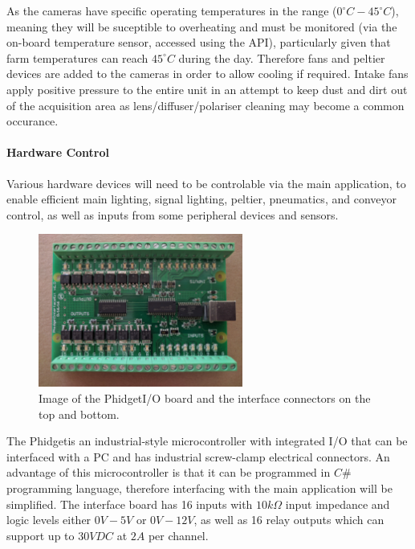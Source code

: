 \documentclass[fleqn,twoside]{article}
\begin{document}
As the cameras have specific operating temperatures in the range ($0^{\circ}C-45^{\circ}C$), meaning they will be suceptible to overheating and must be monitored (via the on-board temperature sensor, accessed using the API), particularly given that farm temperatures can reach $45^{\circ}C$ during the day. Therefore fans and peltier devices are added to the cameras in order to allow cooling if required. Intake fans apply positive pressure to the entire unit in an attempt to keep dust and dirt out of the acquisition area as lens/diffuser/polariser cleaning may become a common occurance.


\paragraph{Hardware Control}
\label{sec:phidget}

Various hardware devices will need to be controlable via the main application, to enable efficient main lighting, signal lighting, peltier, pneumatics, and conveyor control, as well as inputs from some peripheral devices and sensors.



\begin{figure}
	\begin{center}
		\includegraphics[width=0.6\textwidth]{phidget.jpg}
	\end{center}
	\caption{Image of the Phidget\texttrademark I/O board and the interface connectors on the top and bottom.}
	\label{fig:phidget}
\end{figure} 

The Phidget\texttrademark is an industrial-style microcontroller with integrated I/O that can be interfaced with a PC and has industrial screw-clamp electrical connectors. An advantage of this microcontroller is that it can be programmed in $C\#$ programming language, therefore interfacing with the main application will be simplified. The interface board has 16 inputs with $10k\Omega$ input impedance and logic levels either $0V-5V$ or $0V-12V$, as well as 16 relay outputs which can support up to $30VDC$ at $2A$ per channel. 
\end{document}
